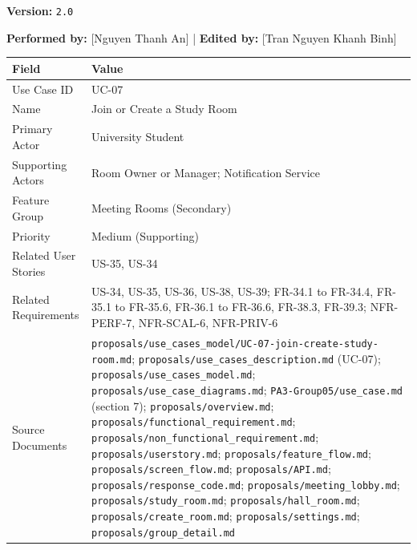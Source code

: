 \documentclass[12pt]{article}
\renewcommand{\baselinestretch}{1.5}
\begin{document}
\textbf{Version:} \texttt{2.0}
\par\medskip

\textbf{Performed by:} [Nguyen Thanh An] | \textbf{Edited by:} [Tran Nguyen Khanh Binh]
\par\medskip

\begingroup
\small
\renewcommand{\baselinestretch}{1.0}\selectfont
\renewcommand{\arraystretch}{1.15}
\setlength{\tabcolsep}{6pt}
\begin{longtable}{|>{\raggedright\arraybackslash}p{}|>{\raggedright\arraybackslash}p{}|}
\hline
\textbf{Field} & \textbf{Value} \\ \hline
\endhead
Use Case ID & UC-07 \\ \hline
Name & Join or Create a Study Room \\ \hline
Primary Actor & University Student \\ \hline
Supporting Actors & Room Owner or Manager; Notification Service \\ \hline
Feature Group & Meeting Rooms (Secondary) \\ \hline
Priority & Medium (Supporting) \\ \hline
Related User Stories & US-35, US-34 \\ \hline
Related Requirements & US-34, US-35, US-36, US-38, US-39; FR-34.1 to FR-34.4, FR-35.1 to FR-35.6, FR-36.1 to FR-36.6, FR-38.3, FR-39.3; NFR-PERF-7, NFR-SCAL-6, NFR-PRIV-6 \\ \hline
Source Documents & \texttt{proposals/use\_cases\_model/UC-07-join-create-study-room.md}; \texttt{proposals/use\_cases\_description.md} (UC-07); \texttt{proposals/use\_cases\_model.md}; \texttt{proposals/use\_case\_diagrams.md}; \texttt{PA3-Group05/use\_case.md} (section 7); \texttt{proposals/overview.md}; \texttt{proposals/functional\_requirement.md}; \texttt{proposals/non\_functional\_requirement.md}; \texttt{proposals/userstory.md}; \texttt{proposals/feature\_flow.md}; \texttt{proposals/screen\_flow.md}; \texttt{proposals/API.md}; \texttt{proposals/response\_code.md}; \texttt{proposals/meeting\_lobby.md}; \texttt{proposals/study\_room.md}; \texttt{proposals/hall\_room.md}; \texttt{proposals/create\_room.md}; \texttt{proposals/settings.md}; \texttt{proposals/group\_detail.md} \\ \hline
\end{longtable}
\endgroup
\par\medskip

\hypertarget{sec:part-a-use-case-model}{}
\end{document}
